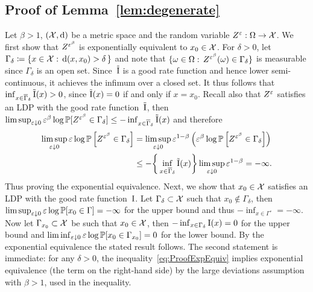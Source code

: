 \subsection{Proof of Lemma~\ref{lem:degenerate}}\label{sec:lem:degenerate_Proof}
Let $\beta > 1$, $(\mathcal{X}, \mathrm{d})$ be a metric space and the random variable $Z^\varepsilon:\Omega\rightarrow \mathcal{X}$. We first show that $Z^{\varepsilon^\beta}$ is exponentially equivalent to $x_0\in \mathcal{X}$. For $\delta > 0$, let $\Gamma_{\delta} \coloneqq \{x \in \mathcal{X} : \, \mathrm{d}(x,x_0)>\delta \, \}$ and note that $\{\omega \in \Omega : \, Z^{\varepsilon^\beta}(\omega)\in\Gamma_\delta\}$ is measurable since $\Gamma_\delta$ is an open set. 
Since~$\tilde{\mathrm{I}}$ is  a good rate function and hence lower semi-continuous, it achieves the infimum over a closed set. 
It thus follows that $\inf_{x\in\overline{\Gamma}_\delta} \tilde{\mathrm{I}}(x) > 0$, since $\tilde{\mathrm{I}}(x)=0$ if and only if $x=x_0$. Recall also that $Z^\varepsilon$ satisfies an LDP with the good rate function~$\tilde{\mathrm{I}}$, then $\limsup_{\varepsilon\downarrow 0}\varepsilon^\beta\log\mathbb{P}[ Z^{\varepsilon^\beta} \in \Gamma_\delta] \leq - \inf_{x\in\overline{\Gamma}_\delta}\tilde{\mathrm{I}}(x)$ and therefore
\begin{align}\label{eq:ProofExpEquiv}
\limsup_{\varepsilon\downarrow 0} \varepsilon \log \mathbb{P} \left[ Z^{\varepsilon^\beta} \in \Gamma_\delta \right] &= \limsup_{\varepsilon\downarrow 0} \varepsilon^{1-\beta}\left(\varepsilon^\beta \log \mathbb{P} \left[ Z^{\varepsilon^\beta} \in \Gamma_\delta \right]\right) \\
&\leq -\bigg\{ \inf_{x\in\overline{\Gamma}_\delta} \tilde{\mathrm{I}}(x)\bigg\} \limsup_{\varepsilon\downarrow 0}\varepsilon^{1-\beta} = -\infty.\nonumber
\end{align}
Thus proving the exponential equivalence. Next, we show that $x_0\in\mathcal{X}$ satisfies an LDP with the good rate function~$\mathrm{I}$. Let $\Gamma_{\delta}\subset\mathcal{X}$ such that $x_0\notin\Gamma_{\delta}$, then $\limsup_{\varepsilon\downarrow 0} \varepsilon \log \mathbb{P}[x_0\in\Gamma]=-\infty$ for the upper bound and thus $-\inf_{x\in\Gamma^\circ}=-\infty$. Now let $\Gamma_{x_0}\subset\mathcal{X}$ be such that $x_0\in\mathcal{X}$, then $-\inf_{x\in\Gamma_{\delta}} \mathrm{I}(x)=0$ for the upper bound and $\liminf_{\varepsilon\downarrow 0}\varepsilon \log \mathbb{P}[x_0\in\Gamma_{x_0}]=0$ for the lower bound. By the exponential equivalence the stated result follows.
The second statement is immediate:
for any $\delta>0$, 
the inequality~\eqref{eq:ProofExpEquiv}
implies exponential equivalence (the term on the right-hand side)
by the large deviations assumption with $\beta>1$, used in the inequality. 

